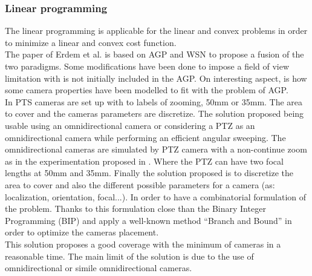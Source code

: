 	 \subsubsection{Linear programming}
	 The linear programming is applicable for the linear and convex problems in order to minimize a linear and convex cost function.\\
The paper of  Erdem et al. \cite{43*erdem2006} is based on AGP and  WSN to propose a fusion of the two paradigms. Some modifications have been done to impose  a  field of view limitation with is not initially included in the AGP. 
  On interesting aspect, is how some camera properties have been modelled to fit with the problem of AGP.  \\
In \cite{43*erdem2006} PTS cameras are set up  with  to labels  of zooming,  50mm or 35mm. The area to cover  and  the cameras parameters are discretize.
The solution proposed being usable  using an omnidirectional camera or considering a PTZ as an omnidirectional camera while  performing an efficient angular sweeping. The omnidirectional cameras are simulated by PTZ camera with a non-continue zoom  as in the experimentation proposed in \cite{43*erdem2006}. Where the PTZ can have two focal lengths at 50mm and  35mm. 
Finally the solution proposed is to discretize the area to cover and also the different possible parameters for a camera (as: localization, orientation, focal...). In order to have a combinatorial formulation of the problem. Thanks to this formulation close than the Binary Integer Programming (BIP) and apply a well-known method “Branch and Bound” in order to optimize the cameras placement.  \\
This solution  proposes a  good  coverage with the minimum of cameras in a reasonable time. The main limit of the solution is due to  the  use of omnidirectional or simile omnidirectional cameras.%

